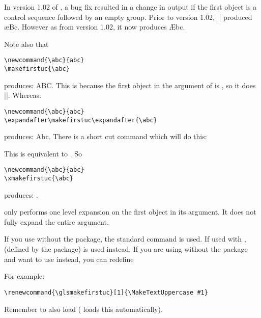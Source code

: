 \documentclass{nlctdoc}
\begin{document}
\begin{important}
In version 1.02 of , a bug fix resulted in a change
in output if the first object is a control sequence followed by
an empty group. Prior to version 1.02, ||
produced \ae Bc. However as from version 1.02, it now produces
\AE bc.
\end{important}

Note also that
\begin{verbatim}
\newcommand{\abc}{abc}
\makefirstuc{\abc}
\end{verbatim}
produces: ABC. This is because the first object in the argument of
 is , so it does |\MakeUppercase{\abc}|.
Whereas:
\begin{verbatim}
\newcommand{\abc}{abc}
\expandafter\makefirstuc\expandafter{\abc}
\end{verbatim}
produces: Abc. There is a short cut command which will do this:
\begin{definition}[\DescribeMacro{\xmakefirstuc}]
\end{definition}
This is equivalent to . So
\begin{verbatim}
\newcommand{\abc}{abc}
\xmakefirstuc{\abc}
\end{verbatim}
produces: 
\newcommand{\abc}{abc}%
\xmakefirstuc{\abc}.

\begin{important}
 only performs one level expansion on the first
object in its argument. It does not fully expand the entire
argument.
\end{important}

If you use  without the  package, 
the standard  command is used. If used with
,  (defined by 
the package) is used instead. If you are using 
without the  package and want to use
 instead, you can redefine
\begin{definition}[\DescribeMacro\glsmakefirstuc]
\end{definition}
For example:
\begin{verbatim}
\renewcommand{\glsmakefirstuc}[1]{\MakeTextUppercase #1}
\end{verbatim}
Remember to also load  ( loads this
automatically).
\end{document}
